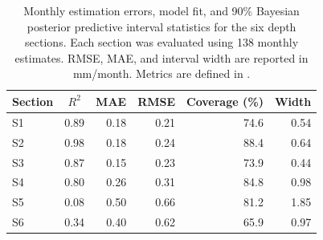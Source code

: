 \begin{table}[htbp]
	\centering
	\small
	\renewcommand{\arraystretch}{1.15}
	\caption[Monthly estimation results during delayed MLCW delivery.]{Monthly estimation errors, model fit, and 90\% Bayesian posterior predictive interval statistics for the six depth sections. Each section was evaluated using 138 monthly estimates. RMSE, MAE, and interval width are reported in mm/month. Metrics are defined in .}
	\label{tab:delayed_performance_interval}
	\begin{tabular}{l|r|r|r|r|r}
		\toprule
		\multicolumn{1}{c|}{\textbf{Section}} & \multicolumn{1}{c|}{\textbf{$R^2$}} & \multicolumn{1}{c|}{\textbf{MAE}} & \multicolumn{1}{c|}{\textbf{RMSE}} & \multicolumn{1}{c|}{\textbf{Coverage (\%)}} & \multicolumn{1}{c}{\textbf{Width}} \\
		\midrule
		S1 & 0.89 & 0.18 & 0.21 & 74.6 & 0.54 \\
		S2 & 0.98 & 0.18 & 0.24 & 88.4 & 0.64 \\
		S3 & 0.87 & 0.15 & 0.23 & 73.9 & 0.44 \\
		S4 & 0.80 & 0.26 & 0.31 & 84.8 & 0.98 \\
		S5 & 0.08 & 0.50 & 0.66 & 81.2 & 1.85 \\
		S6 & 0.34 & 0.40 & 0.62 & 65.9 & 0.97 \\
		\bottomrule
	\end{tabular}
\end{table}

